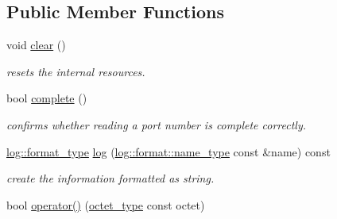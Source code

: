 \subsection*{Public Member Functions}
\begin{DoxyCompactItemize}
\item 
\hypertarget{classhryky_1_1ip_1_1port_1_1_reader_aa0ff8e7089ab6e494191371f743ba010}{void \hyperlink{classhryky_1_1ip_1_1port_1_1_reader_aa0ff8e7089ab6e494191371f743ba010}{clear} ()}\label{classhryky_1_1ip_1_1port_1_1_reader_aa0ff8e7089ab6e494191371f743ba010}

\begin{DoxyCompactList}\small\item\em resets the internal resources. \end{DoxyCompactList}\item 
\hypertarget{classhryky_1_1ip_1_1port_1_1_reader_a8419dffbea2a25f10e01ba4f51feccef}{bool \hyperlink{classhryky_1_1ip_1_1port_1_1_reader_a8419dffbea2a25f10e01ba4f51feccef}{complete} ()}\label{classhryky_1_1ip_1_1port_1_1_reader_a8419dffbea2a25f10e01ba4f51feccef}

\begin{DoxyCompactList}\small\item\em confirms whether reading a port number is complete correctly. \end{DoxyCompactList}\item 
\hypertarget{classhryky_1_1ip_1_1port_1_1_reader_a698fbd7e25df3dfd69bfdb806f3b8777}{\hyperlink{namespacehryky_1_1log_ad50448c3f934f1eacd5c1bcffe8111e1}{log\-::format\-\_\-type} \hyperlink{classhryky_1_1ip_1_1port_1_1_reader_a698fbd7e25df3dfd69bfdb806f3b8777}{log} (\hyperlink{namespacehryky_1_1log_1_1format_ab7408d1e2ed2d648dbf9bba69eb74288}{log\-::format\-::name\-\_\-type} const \&name) const }\label{classhryky_1_1ip_1_1port_1_1_reader_a698fbd7e25df3dfd69bfdb806f3b8777}

\begin{DoxyCompactList}\small\item\em create the information formatted as string. \end{DoxyCompactList}\item 
\hypertarget{classhryky_1_1ip_1_1port_1_1_reader_a64bb586041f1e0d5a16715ed69b9f355}{bool \hyperlink{classhryky_1_1ip_1_1port_1_1_reader_a64bb586041f1e0d5a16715ed69b9f355}{operator()} (\hyperlink{namespacehryky_a488cba8b666be33ccca70e819684e3c8}{octet\-\_\-type} const octet)}\label{classhryky_1_1ip_1_1port_1_1_reader_a64bb586041f1e0d5a16715ed69b9f355}


\end{DoxyCompactItemize}
